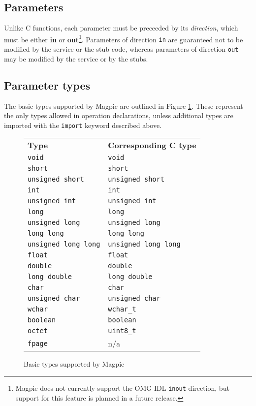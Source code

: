 \subsection{Parameters}
Unlike C functions, each parameter must be preceeded by its {\it direction}, which must be either {\bf in} or {\bf out}\footnote{Magpie does not currently support the OMG IDL {\tt inout} direction, but support for this feature is planned in a future release.}. Parameters of direction {\tt in} are guaranteed not to be modified by the service or the stub code, whereas parameters of direction {\tt out} may be modified by the service or by the stubs.

\subsection{Parameter types}
\label{writingidl.parameter.types}
The basic types supported by Magpie are outlined in Figure \ref{fig.writingidl.parameter.types}. These represent the only types allowed in operation declarations, unless additional types are imported with the {\tt import} keyword described above.

\begin{figure}
\begin{tabularx}{\textwidth}{ll}
\textbf{Type} & \textbf{Corresponding C type}\\
{\tt void} & {\tt void} \\
{\tt short} & {\tt short} \\
{\tt unsigned short} & {\tt unsigned short}\\
{\tt int} & {\tt int} \\
{\tt unsigned int} & {\tt unsigned int}\\
{\tt long} & {\tt long} \\
{\tt unsigned long} & {\tt unsigned long} \\
{\tt long long} & {\tt long long} \\
{\tt unsigned long long} & {\tt unsigned long long} \\
{\tt float} & {\tt float} \\
{\tt double} & {\tt double} \\
{\tt long double} & {\tt long double} \\
{\tt char} & {\tt char} \\
{\tt unsigned char} & {\tt unsigned char} \\
{\tt wchar} & {\tt wchar\_t} \\
{\tt boolean} & {\tt boolean} \\
{\tt octet} & {\tt uint8\_t} \\
{\tt fpage} & n/a \\
\end{tabularx}
\caption{Basic types supported by Magpie}
\label{fig.writingidl.parameter.types}
\end{figure}

